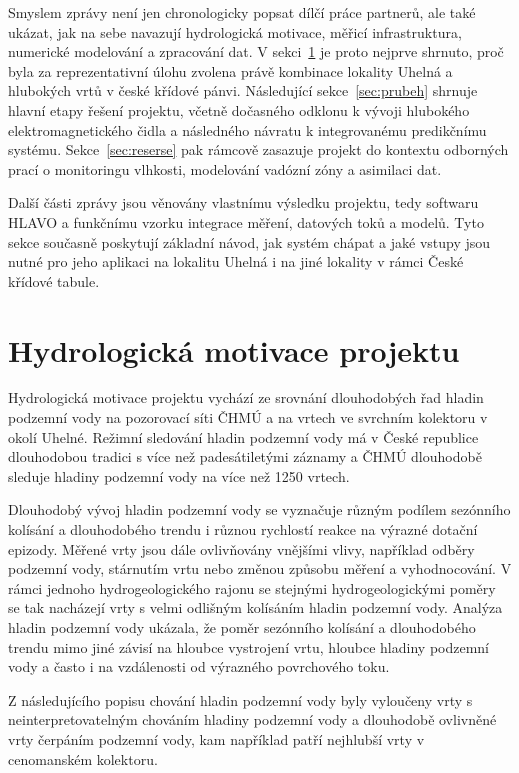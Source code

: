 \documentclass[11pt,a4paper]{article}
\begin{document}
\begin{onehalfspacing}
Smyslem zprávy není jen chronologicky popsat dílčí práce partnerů, ale také
ukázat, jak na sebe navazují hydrologická motivace, měřicí infrastruktura,
numerické modelování a zpracování dat. V sekci~\ref{sec:motivace} je proto
nejprve shrnuto, proč byla za reprezentativní úlohu zvolena právě kombinace
lokality Uhelná a hlubokých vrtů v české křídové pánvi. Následující
sekce~\ref{sec:prubeh} shrnuje hlavní etapy řešení projektu, včetně
dočasného odklonu k vývoji hlubokého elektromagnetického čidla a následného
návratu k integrovanému predikčnímu systému. Sekce~\ref{sec:reserse} pak
rámcově zasazuje projekt do kontextu odborných prací o monitoringu
vlhkosti, modelování vadózní zóny a asimilaci dat.

Další části zprávy jsou věnovány vlastnímu výsledku projektu, tedy softwaru
HLAVO a funkčnímu vzorku integrace měření, datových toků a modelů. Tyto
sekce současně poskytují základní návod, jak systém chápat a jaké vstupy
jsou nutné pro jeho aplikaci na lokalitu Uhelná i na jiné lokality v rámci
České křídové tabule.

\section{Hydrologická motivace projektu}
\label{sec:motivace}
Hydrologická motivace projektu vychází ze srovnání dlouhodobých řad hladin
podzemní vody na pozorovací síti ČHMÚ a na vrtech ve svrchním kolektoru v
okolí Uhelné. Režimní sledování hladin podzemní vody má v České republice
dlouhodobou tradici s více než padesátiletými záznamy a ČHMÚ dlouhodobě
sleduje hladiny podzemní vody na více než 1250 vrtech.

Dlouhodobý vývoj hladin podzemní vody se vyznačuje různým podílem
sezónního kolísání a dlouhodobého trendu i různou rychlostí reakce na výrazné
dotační epizody. Měřené vrty jsou dále ovlivňovány vnějšími vlivy, například odběry
podzemní vody, stárnutím vrtu nebo změnou způsobu měření a vyhodnocování. V
rámci jednoho hydrogeologického rajonu se stejnými hydrogeologickými poměry se
tak nacházejí vrty s velmi odlišným kolísáním hladin podzemní vody. Analýza
hladin podzemní vody ukázala, že poměr sezónního kolísání a dlouhodobého
trendu mimo jiné závisí na hloubce vystrojení vrtu, hloubce hladiny podzemní
vody a často i na vzdálenosti od výrazného povrchového toku.

Z následujícího popisu chování hladin podzemní vody byly vyloučeny vrty s
neinterpretovatelným chováním hladiny podzemní vody a dlouhodobě ovlivněné
vrty čerpáním podzemní vody, kam například patří nejhlubší vrty v
cenomanském kolektoru.


\end{onehalfspacing}
\end{document}
